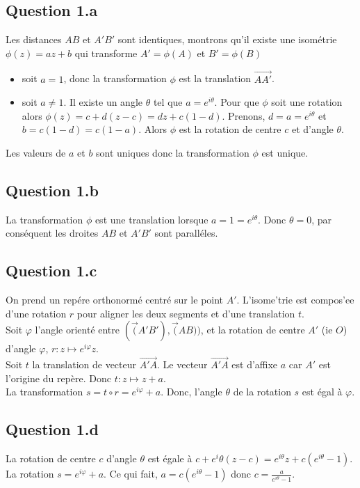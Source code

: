 \documentclass[]{book}
\theoremstyle{definition}
\begin{document}
\subsection*{Question 1.a}
Les distances $AB$ et $A'B'$ sont identiques, montrons qu'il existe une isom\'etrie $\phi(z) =  az+ b$ qui transforme $A' = \phi(A)$ et $B' = \phi(B)$ 
\begin{itemize}
\item soit $a=1$, donc la transformation $\phi$ est la translation $\overrightarrow{AA'}$.
\item soit $a \neq 1$. Il existe un angle $\theta$ tel que $a=e^{i\theta}$. Pour que $\phi$ soit une rotation alors $\phi(z) =  c + d(z - c) = dz +c(1-d)$. Prenons, $d = a = e^{i\theta}$ et $b=c(1-d)=c(1-a)$. Alors $\phi$ est la rotation de centre $c$ et d'angle $\theta$. 
\end{itemize}

Les valeurs de $a$ et $b$ sont uniques donc la transformation $\phi$ est unique.

\subsection*{Question 1.b}
La transformation $\phi$ est une translation lorsque $a=1=e^{i\theta}$. Donc $\theta = 0$, par cons\'equent les droites $AB$ et $A'B'$ sont parall\'eles. 

\subsection*{Question 1.c}
On prend un rep\'ere orthonorm\'e centr\'e sur le point $A'$. L'isome'trie est compos'ee d'une rotation $r$ pour aligner les deux segments et d'une translation $t$.\\

Soit $\varphi$ l'angle orient\'e entre $(\vec(A'B'), \vec(AB))$, et la rotation de centre $A'$ (ie $O$) d'angle $\varphi$, $r: z \mapsto e^{i\varphi}z$.\\

Soit $t$ la translation de vecteur $\vec{A'A}$. Le vecteur $\vec{A'A}$ est d'affixe $a$ car $A'$ est l'origine du rep\`ere. Donc $t: z\mapsto z+a$.\\

La transformation $s = t \circ r = e^{i\varphi} + a$. Donc, l'angle $\theta$ de la rotation $s$ est \'egal \`a $\varphi$.


\subsection*{Question 1.d}
La rotation de centre $c$ d'angle $\theta$ est \'egale \`a $c + e^i{\theta}(z-c) = e^{i\theta}z + c(e^{i\theta}-1)$. La rotation $s = e^{i\varphi} + a$. Ce qui fait, $a = c(e^{i\theta}-1)$ donc $c=\frac{a}{e^{i\theta}-1}$.
\end{document}
